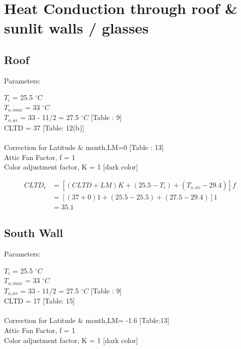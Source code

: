 \documentclass{article}
\begin{document}
    \section[Heat Conduction through roof \& sunlit walls / glasses]{Heat Conduction through roof \& sunlit walls / glasses}
    \subsection{Roof}
    Parameters:
    \begin{multicols}{2}
      $T_i$ = 25.5 $^{\circ}C$ \\
      $T_{o,max}$ = 33 $^{\circ}C$ \\
      $T_{o,av}$ = 33 - 11/2 = 27.5 $^{\circ}C$ [Table : 9] \\
      CLTD = 37  [Table: 12(b)]\\
      \\
      Correction for Latitude \& month,LM=0 [Table : 13] \\
      Attic Fan Factor, f = 1 \\
      Color adjustment factor, K = 1 [dark color] \\
    \end{multicols}

    \begin{align*}
      CLTD_c &= \left[(CLTD + LM)K + (25.5 - T_i) + (T_{o,av} - 29.4)\right] f \\
      &= \left[(37 + 0)1 + (25.5 - 25.5) + (27.5 - 29.4)\right] 1 \\
      &= 35.1 
    \end{align*}

    \subsection{South Wall}
    Parameters:
    \begin{multicols}{2}
      $T_i$ = 25.5 $^{\circ}C$ \\
      $T_{o,max}$ = 33 $^{\circ}C$ \\
      $T_{o,av}$ = 33 - 11/2 = 27.5 $^{\circ}C$ [Table : 9] \\
      CLTD = 17  [Table: 15]\\
      \\
      Correction for Latitude \& month,LM= -1.6 [Table:13] \\
      Attic Fan Factor, f = 1 \\
      Color adjustment factor, K = 1 [dark color] \\
    \end{multicols}
\end{document}
